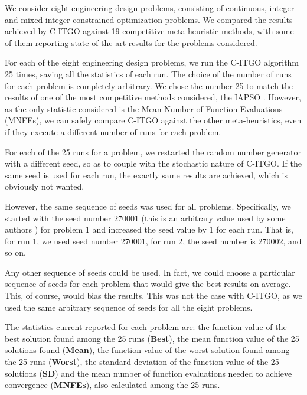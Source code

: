 \begin{revAns}
We consider eight engineering design problems, consisting of continuous, integer and mixed-integer constrained optimization problems. We compared the results achieved by C-ITGO against 19 competitive meta-heuristic methods, with some of them reporting state of the art results for the problems considered.

For each of the eight engineering design problems, we run the C-ITGO algorithm 25 times, saving all the statistics of each run. The choice of the number of runs for each problem is completely arbitrary. We chose the number 25 to match the results of one of the most competitive methods considered, the IAPSO \citep{IAPSO}. However, as the only statistic considered is the Mean Number of Function Evaluations (MNFEs), we can safely compare C-ITGO against the other meta-heuristics, even if they execute a different number of runs for each problem.

For each of the 25 runs for a problem, we restarted the random number generator with a different seed, so as to couple with the stochastic nature of C-ITGO. If the same seed is used for each run, the exactly same results are achieved, which is obviously not wanted.

However, the same sequence of seeds was used for all problems. Specifically, we started with the seed number $270001$ (this is an arbitrary value used by some authors \citep{BRKGABB}) for problem 1 and increased the seed value by 1 for each run. That is, for run 1, we used seed number 270001, for run 2, the seed number is 270002, and so on.

Any other sequence of seeds could be used. In fact, we could choose a particular sequence of seeds for each problem that would give the best results on average. This, of course, would bias the results. This was not the case with C-ITGO, as we used the same arbitrary sequence of seeds for all the eight problems.

The statistics current reported for each problem are: the function value of the best solution found among the 25 runs (\textbf{Best}), the mean function value of the 25 solutions found (\textbf{Mean}), the function value of the worst solution found among the 25 runs (\textbf{Worst}), the standard deviation of the function value of the 25 solutions (\textbf{SD}) and the mean number of function evaluations needed to achieve convergence (\textbf{MNFEs}), also calculated among the 25 runs.



\end{revAns}
